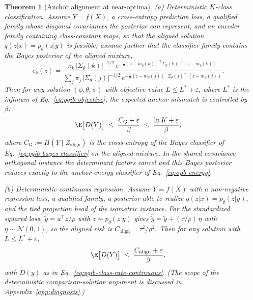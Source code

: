 \documentclass{article} %
\theoremstyle{plain}
\newtheorem{theorem}{Theorem}[section]
\theoremstyle{remark}
\begin{document}
\begin{theorem}[Anchor alignment at near-optima]
\label{prop:pgib-alignment}
\emph{(a) Deterministic $K$-class classification.} Assume $Y = f(X)$, a
cross-entropy prediction loss, a qualified family whose diagonal covariances the
posterior can represent, and an encoder family containing class-constant maps, so
that the aligned solution $q(z|x) = p_\theta(z|y)$ is feasible; assume further that
the classifier family contains the Bayes posterior of the aligned mixture,
\begin{equation}
c_k(z) = \frac{\pi_k\, |\Sigma_\theta(k)|^{-1/2}\, e^{-\frac{1}{2}(z - m_\theta(k))^{\top}\Sigma_\theta(k)^{-1}(z - m_\theta(k))}}
{\sum_j \pi_j\, |\Sigma_\theta(j)|^{-1/2}\, e^{-\frac{1}{2}(z - m_\theta(j))^{\top}\Sigma_\theta(j)^{-1}(z - m_\theta(j))}} .
\label{eq:pgib-bayes-classifier}
\end{equation}
Then for any solution $(\phi, \theta, \psi)$ with objective value
$L \le L^* + \varepsilon$, where $L^*$ is the infimum of
Eq.~\eqref{eq:pgib-objective}, the expected anchor mismatch is controlled by $\beta$:
\begin{equation}
\E\bigl[ D(Y) \bigr] \;\le\; \frac{C_{\mathrm{G}} + \varepsilon}{\beta}
\;\le\; \frac{\ln K + \varepsilon}{\beta},
\label{eq:pgib-alignment}
\end{equation}
where $C_{\mathrm{G}} := H(Y \mid Z_{\mathrm{align}})$ is the cross-entropy of the
Bayes classifier of Eq.~\eqref{eq:pgib-bayes-classifier} on the aligned mixture. In
the shared-covariance orthogonal instance the determinant factors cancel and this
Bayes posterior reduces exactly to the anchor-energy classifier of
Eq.~\eqref{eq:opb-energy}.

\emph{(b) Deterministic continuous regression.} Assume $Y = f(X)$ with a
non-negative regression loss, a qualified family, a posterior able to realize
$q(z|x) = p_\theta(z|y)$, and the tied projection head of the isometric instance.
For the standardized squared loss, $\hat{\tilde y} = u^{\top} z/\rho$ with
$z \sim p_\theta(z|y)$ gives $\hat{\tilde y} = \tilde y + (\tau/\rho)\,\eta$ with
$\eta \sim \mathcal{N}(0,1)$, so the aligned risk is
$C_{\mathrm{align}} = \tau^2/\rho^2$. Then for any solution with
$L \le L^* + \varepsilon$,
\begin{equation}
\E\bigl[ D(Y) \bigr] \;\le\; \frac{C_{\mathrm{align}} + \varepsilon}{\beta} ,
\label{eq:pgib-alignment-regression}
\end{equation}
with $D(y)$ as in Eq.~\eqref{eq:pgib-class-rate-continuous}. (The scope of the
deterministic comparison-solution argument is discussed in
Appendix~\ref{app:diagnosis}.)
\end{theorem}
\end{document}
